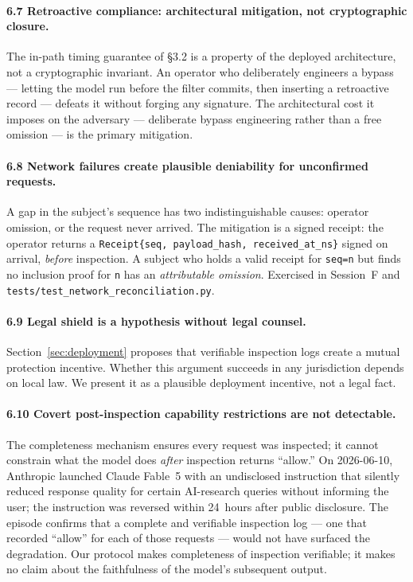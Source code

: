 \documentclass[11pt,a4paper]{article}
\newcommand{\code}[1]{\texttt{#1}}
\newcommand{\term}[1]{\emph{#1}}
\begin{document}
\paragraph{6.7 Retroactive compliance: architectural mitigation, not cryptographic closure.}
The in-path timing guarantee of \S3.2 is a property of the deployed architecture, not a
cryptographic invariant. An operator who deliberately engineers a bypass --- letting the
model run before the filter commits, then inserting a retroactive record --- defeats it
without forging any signature. The architectural cost it imposes on the adversary ---
deliberate bypass engineering rather than a free omission --- is the primary mitigation.

\paragraph{6.8 Network failures create plausible deniability for unconfirmed requests.}
A gap in the subject's sequence has two indistinguishable causes: operator omission, or
the request never arrived. The mitigation is a signed receipt: the operator
returns a \code{Receipt\{seq, payload\_hash, received\_at\_ns\}} signed on arrival,
\emph{before} inspection. A subject who holds a valid receipt for \code{seq=n} but
finds no inclusion proof for \code{n} has an \term{attributable omission}. Exercised in
Session~F and \code{tests/test\_network\_reconciliation.py}.

\paragraph{6.9 Legal shield is a hypothesis without legal counsel.}
Section~\ref{sec:deployment} proposes that verifiable inspection logs create a mutual
protection incentive. Whether this argument succeeds in any jurisdiction depends on local
law. We present it as a plausible deployment incentive, not a legal fact.

\paragraph{6.10 Covert post-inspection capability restrictions are not detectable.}
The completeness mechanism ensures every request was inspected; it cannot constrain what
the model does \emph{after} inspection returns ``allow.'' On 2026-06-10, Anthropic
launched Claude Fable~5 with an undisclosed instruction that silently reduced response
quality for certain AI-research queries without informing the user; the instruction was
reversed within 24~hours after public disclosure. The episode confirms that a complete
and verifiable inspection log --- one that recorded ``allow'' for each of those requests
--- would not have surfaced the degradation. Our protocol makes completeness of
inspection verifiable; it makes no claim about the faithfulness of the model's subsequent
output.
\end{document}
